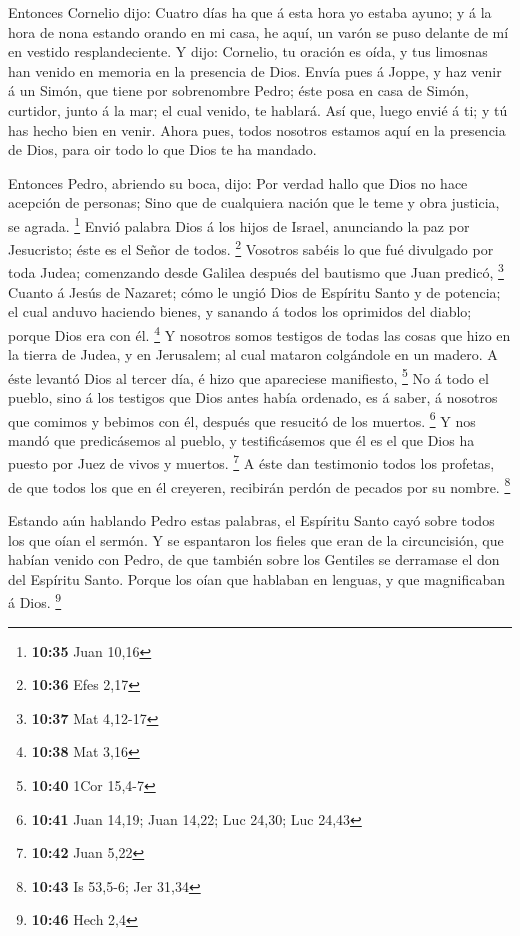  Entonces Cornelio dijo: Cuatro días ha que á esta hora
yo estaba ayuno; y á la hora de nona estando orando en mi casa, he aquí,
un varón se puso delante de mí en vestido resplandeciente.
 Y dijo: Cornelio, tu oración es oída, y tus limosnas han
venido en memoria en la presencia de Dios.  Envía pues á
Joppe, y haz venir á un Simón, que tiene por sobrenombre Pedro; éste
posa en casa de Simón, curtidor, junto á la mar; el cual venido, te
hablará.  Así que, luego envié á ti; y tú has hecho bien
en venir. Ahora pues, todos nosotros estamos aquí en la presencia de
Dios, para oir todo lo que Dios te ha mandado.

 Entonces Pedro, abriendo su boca, dijo: Por verdad hallo
que Dios no hace acepción de personas;  Sino que de
cualquiera nación que le teme y obra justicia, se agrada. \footnote{\textbf{10:35}
  Juan 10,16}  Envió palabra Dios á los hijos de Israel,
anunciando la paz por Jesucristo; éste es el Señor de todos. \footnote{\textbf{10:36}
  Efes 2,17}  Vosotros sabéis lo que fué divulgado por
toda Judea; comenzando desde Galilea después del bautismo que Juan
predicó, \footnote{\textbf{10:37} Mat 4,12-17}  Cuanto á
Jesús de Nazaret; cómo le ungió Dios de Espíritu Santo y de potencia; el
cual anduvo haciendo bienes, y sanando á todos los oprimidos del diablo;
porque Dios era con él. \footnote{\textbf{10:38} Mat 3,16}
 Y nosotros somos testigos de todas las cosas que hizo en
la tierra de Judea, y en Jerusalem; al cual mataron colgándole en un
madero.  A éste levantó Dios al tercer día, é hizo que
apareciese manifiesto, \footnote{\textbf{10:40} 1Cor 15,4-7}
 No á todo el pueblo, sino á los testigos que Dios antes
había ordenado, es á saber, á nosotros que comimos y bebimos con él,
después que resucitó de los muertos. \footnote{\textbf{10:41} Juan
  14,19; Juan 14,22; Luc 24,30; Luc 24,43}  Y nos mandó
que predicásemos al pueblo, y testificásemos que él es el que Dios ha
puesto por Juez de vivos y muertos. \footnote{\textbf{10:42} Juan 5,22}
 A éste dan testimonio todos los profetas, de que todos
los que en él creyeren, recibirán perdón de pecados por su nombre.
\footnote{\textbf{10:43} Is 53,5-6; Jer 31,34}

 Estando aún hablando Pedro estas palabras, el Espíritu
Santo cayó sobre todos los que oían el sermón.  Y se
espantaron los fieles que eran de la circuncisión, que habían venido con
Pedro, de que también sobre los Gentiles se derramase el don del
Espíritu Santo.  Porque los oían que hablaban en lenguas,
y que magnificaban á Dios. \footnote{\textbf{10:46} Hech 2,4}

